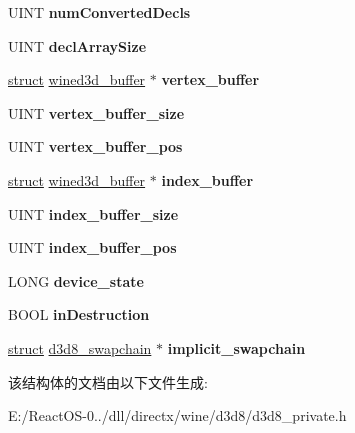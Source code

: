 \begin{DoxyCompactItemize}
U\+I\+NT {\bfseries num\+Converted\+Decls}
\item 
\mbox{\label{structd3d8__device_a4e1af12d6adbe94c95000704ef45fcf1}} 
U\+I\+NT {\bfseries decl\+Array\+Size}
\item 
\mbox{\label{structd3d8__device_ab2f64ce85ae5c5c631150136d322081a}} 
\hyperlink{interfacestruct}{struct} \hyperlink{structwined3d__buffer}{wined3d\+\_\+buffer} $\ast$ {\bfseries vertex\+\_\+buffer}
\item 
\mbox{\label{structd3d8__device_ab5bc928b2551e7e9cccb5e35fb7437fd}} 
U\+I\+NT {\bfseries vertex\+\_\+buffer\+\_\+size}
\item 
\mbox{\label{structd3d8__device_a1001e753b8405388055cb4014079822b}} 
U\+I\+NT {\bfseries vertex\+\_\+buffer\+\_\+pos}
\item 
\mbox{\label{structd3d8__device_a044410d5d54a892dfee36be1a2cb3b25}} 
\hyperlink{interfacestruct}{struct} \hyperlink{structwined3d__buffer}{wined3d\+\_\+buffer} $\ast$ {\bfseries index\+\_\+buffer}
\item 
\mbox{\label{structd3d8__device_a6cf44eda44a8a97a7ef37eaf0c3f4a4a}} 
U\+I\+NT {\bfseries index\+\_\+buffer\+\_\+size}
\item 
\mbox{\label{structd3d8__device_ab3433b318857c8ae2e4ddc0992a87466}} 
U\+I\+NT {\bfseries index\+\_\+buffer\+\_\+pos}
\item 
\mbox{\label{structd3d8__device_abd3e7d07a84b52ecf2efe3e0cc4da29f}} 
L\+O\+NG {\bfseries device\+\_\+state}
\item 
\mbox{\label{structd3d8__device_af046d55dd787706f65d046f9b7037fba}} 
B\+O\+OL {\bfseries in\+Destruction}
\item 
\mbox{\label{structd3d8__device_af1c12f59ce491122c4571ffefd5b415f}} 
\hyperlink{interfacestruct}{struct} \hyperlink{structd3d8__swapchain}{d3d8\+\_\+swapchain} $\ast$ {\bfseries implicit\+\_\+swapchain}
\end{DoxyCompactItemize}


该结构体的文档由以下文件生成\+:\begin{DoxyCompactItemize}
\item 
E\+:/\+React\+O\+S-\/0../dll/directx/wine/d3d8/d3d8\+\_\+private.\+h\end{DoxyCompactItemize}
